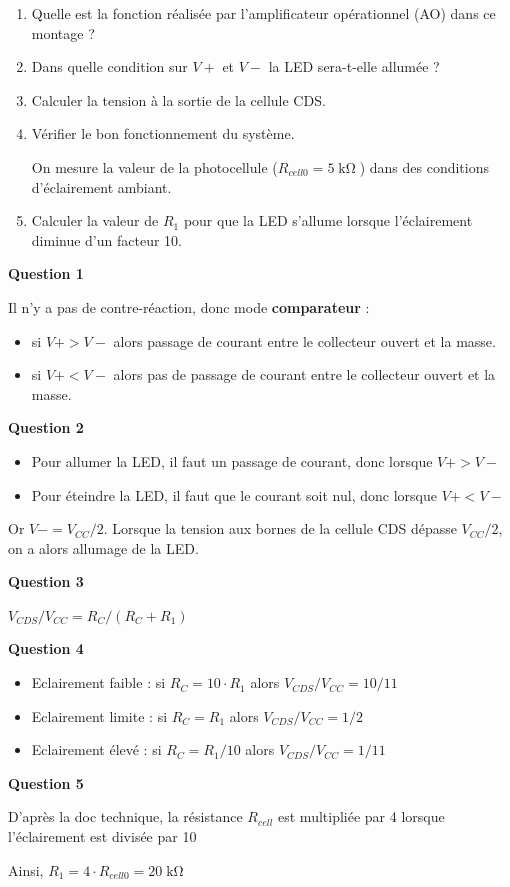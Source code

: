 \documentclass[a4paper,french]{paper}
\begin{document}
{\begin{enumerate}
	\item Quelle est la fonction réalisée par l'amplificateur opérationnel (AO) dans ce montage ?
	\item Dans quelle condition sur $V+$ et $V-$ la LED sera-t-elle allumée ?
	\item Calculer la tension à la sortie de la cellule CDS.
	\item Vérifier le bon fonctionnement du système.

\medskip
	
	On mesure la valeur de la photocellule ($R_{cell0} = 5\operatorname{k\Omega}$) dans des conditions d'éclairement ambiant. 
	
	\item Calculer la valeur de $R_1$ pour que la LED s'allume lorsque l'éclairement diminue d'un facteur 10.
\end{enumerate}
}


\textbf{Question 1}

Il n'y a pas de contre-réaction, donc mode \textbf{comparateur} :

\begin{itemize}
	\item si $V+ > V-$ alors passage de courant entre le collecteur ouvert et la masse.
	\item si $V+ < V-$ alors pas de passage de courant entre le collecteur ouvert et la masse.
\end{itemize}

\textbf{Question 2}

\begin{itemize}
	\item Pour allumer la LED, il faut un passage de courant, donc lorsque $V+ > V-$
	\item Pour éteindre la LED, il faut que le courant soit nul, donc lorsque $V+ < V-$
\end{itemize}

Or $V- = V_{CC} / 2$. Lorsque la tension aux bornes de la cellule CDS dépasse $V_{CC} / 2$, on a alors allumage de la LED.

\textbf{Question 3}

$V_{CDS} / V_{CC} = R_C / (R_C + R_1)$

\textbf{Question 4}

\begin{itemize}
	\item Eclairement faible : si $R_C = 10 \cdot R_1$ alors $V_{CDS} / V_{CC} = 10 / 11$
	\item Eclairement limite : si $R_C = R_1$ alors $V_{CDS} / V_{CC} = 1 / 2$ 
	\item Eclairement élevé : si $R_C = R_1 / 10$ alors $V_{CDS} / V_{CC} = 1 / 11$
\end{itemize}

\textbf{Question 5}


D'après la doc technique, la résistance $R_{cell}$ est multipliée par 4 lorsque l'éclairement est divisée par 10

Ainsi, $R_1 = 4 \cdot R_{cell0} = 20 \operatorname{k\Omega}$
\end{document}
